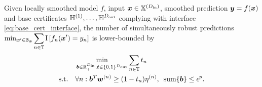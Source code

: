 \begin{customthm}{4.2}
Given locally smoothed model $f$, input ${\bm{x}} \in {\mathbb{X}}^{(D_\mathrm{in})}$, smoothed prediction ${\bm{y}} = f({\bm{x}})$ and base certificates ${\mathbb{H}}^{(1)},\dots,{\mathbb{H}}^{D_\mathrm{out}}$ complying with interface \autoref{eq:base_cert_interface}, the number of simultaneously robust predictions
	$\min_{\vx' \in \sB_\vx} \smashoperator{\sum_{n \in \sT}} \mathrm{I}\left[f_n(\vx') = \evy_n \right]$ is lower-bounded by
	\begin{align}
		& \min_{{\bm{b}} \in {\mathbb{R}}_+^{D_\mathrm{in}}, {\bm{t}} \in \{0,1\}^{D_\mathrm{out}}} \sum_{n \in {\mathbb{T}}} {t}_n \quad \\
		\text{s.t.} \quad
		& \forall n: 
		{\bm{b}}^T {\bm{w}}^{(n)} \geq (1 - {t}_n) \eta^{(n)},  \enskip \mathrm{sum}\{{\bm{b}}\} \leq \epsilon^p.
	\end{align}
\end{customthm}
